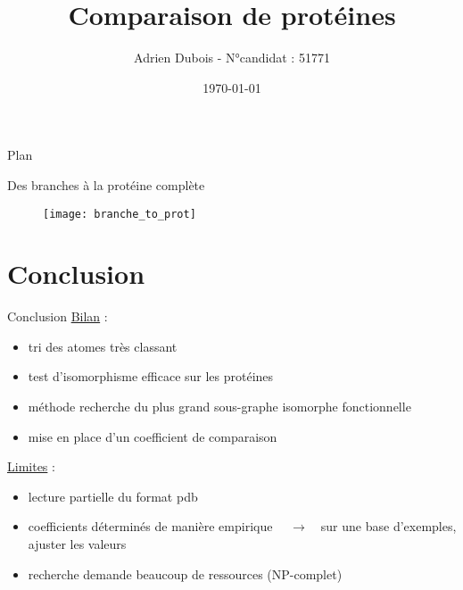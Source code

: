 


\title{Comparaison de protéines}
\author{Adrien Dubois - N°candidat : 51771}
\date{\today}


\maketitle

\begin{frame}{Plan}
\vspace*{1.21cm}
\tableofcontents
\end{frame}





\begin{frame}{Des branches à la protéine complète}
    \normalsize
    \begin{figure}[!htb]
        \centering
        \texttt{[image: branche\_to\_prot]}
    \end{figure}
\end{frame}







\section{Conclusion}
\begin{frame}{Conclusion}
    \underline{Bilan} :
    \begin{itemize}
        \item tri des atomes très classant
        \item test d'isomorphisme efficace sur les protéines
        \item méthode recherche du plus grand sous-graphe isomorphe fonctionnelle 
        \item mise en place d'un coefficient de comparaison
    \end{itemize}
    \underline{Limites} : 
    \begin{itemize}
        \item lecture partielle du format pdb
        \item coefficients déterminés de manière empirique
        \newline $\quad \rightarrow \quad$sur une base d'exemples, ajuster les valeurs
        \item recherche demande beaucoup de ressources (NP-complet)
    \end{itemize}
\end{frame}

